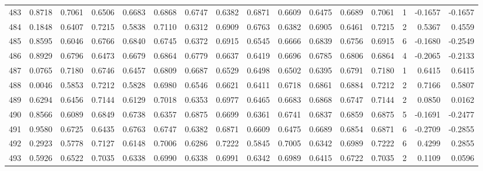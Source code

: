 \begin{tabular}{lrrrrrrrrrrrrrrr}
483 &      0.8718 &  0.7061 &  0.6506 &  0.6683 &  0.6868 &  0.6747 &  0.6382 &  0.6871 &  0.6609 &  0.6475 &   0.6689 &     0.7061 &      1 &                   -0.1657 &                    -0.1657 \\
484 &      0.1848 &  0.6407 &  0.7215 &  0.5838 &  0.7110 &  0.6312 &  0.6909 &  0.6763 &  0.6382 &  0.6905 &   0.6461 &     0.7215 &      2 &                    0.5367 &                     0.4559 \\
485 &      0.8595 &  0.6046 &  0.6766 &  0.6840 &  0.6745 &  0.6372 &  0.6915 &  0.6545 &  0.6666 &  0.6839 &   0.6756 &     0.6915 &      6 &                   -0.1680 &                    -0.2549 \\
486 &      0.8929 &  0.6796 &  0.6473 &  0.6679 &  0.6864 &  0.6779 &  0.6637 &  0.6419 &  0.6696 &  0.6785 &   0.6806 &     0.6864 &      4 &                   -0.2065 &                    -0.2133 \\
487 &      0.0765 &  0.7180 &  0.6746 &  0.6457 &  0.6809 &  0.6687 &  0.6529 &  0.6498 &  0.6502 &  0.6395 &   0.6791 &     0.7180 &      1 &                    0.6415 &                     0.6415 \\
488 &      0.0046 &  0.5853 &  0.7212 &  0.5828 &  0.6980 &  0.6546 &  0.6621 &  0.6411 &  0.6718 &  0.6861 &   0.6884 &     0.7212 &      2 &                    0.7166 &                     0.5807 \\
489 &      0.6294 &  0.6456 &  0.7144 &  0.6129 &  0.7018 &  0.6353 &  0.6977 &  0.6465 &  0.6683 &  0.6868 &   0.6747 &     0.7144 &      2 &                    0.0850 &                     0.0162 \\
490 &      0.8566 &  0.6089 &  0.6849 &  0.6738 &  0.6357 &  0.6875 &  0.6699 &  0.6361 &  0.6741 &  0.6837 &   0.6859 &     0.6875 &      5 &                   -0.1691 &                    -0.2477 \\
491 &      0.9580 &  0.6725 &  0.6435 &  0.6763 &  0.6747 &  0.6382 &  0.6871 &  0.6609 &  0.6475 &  0.6689 &   0.6854 &     0.6871 &      6 &                   -0.2709 &                    -0.2855 \\
492 &      0.2923 &  0.5778 &  0.7127 &  0.6148 &  0.7006 &  0.6286 &  0.7222 &  0.5845 &  0.7005 &  0.6342 &   0.6989 &     0.7222 &      6 &                    0.4299 &                     0.2855 \\
493 &      0.5926 &  0.6522 &  0.7035 &  0.6338 &  0.6990 &  0.6338 &  0.6991 &  0.6342 &  0.6989 &  0.6415 &   0.6722 &     0.7035 &      2 &                    0.1109 &                     0.0596 \\

\end{tabular}
